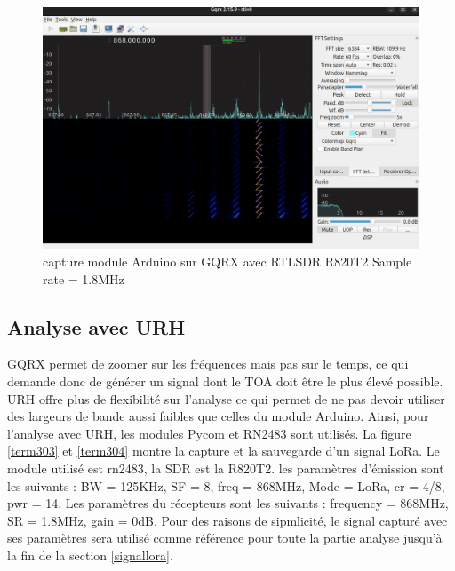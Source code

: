 \begin{figure}[h]
\centering

\includegraphics[scale=0.17]{images/gqrx5.png}
\caption{capture module Arduino sur GQRX avec RTLSDR R820T2 Sample rate = 1.8MHz}\label{term302}
\end{figure}


\subsection{Analyse avec URH}\label{urh}

GQRX permet de zoomer sur les fréquences mais pas sur le temps, ce qui demande donc de générer un signal dont le TOA doit être le plus élevé possible. URH offre plus de flexibilité sur l'analyse ce qui permet de ne pas devoir utiliser des largeurs de bande aussi faibles que celles du module Arduino. Ainsi, pour l'analyse avec URH, les modules Pycom et RN2483 sont utilisés. La figure \ref{term303} et \ref{term304} montre la capture et la sauvegarde d'un signal LoRa. Le module utilisé est rn2483, la SDR est la R820T2. les paramètres d'émission sont les suivants : BW = 125KHz, SF = 8, freq = 868MHz, Mode = LoRa, cr = 4/8, pwr = 14. Les paramètres du récepteurs sont les suivants : frequency = 868MHz, SR = 1.8MHz, gain = 0dB. Pour des raisons de sipmlicité, le signal capturé avec ses paramètres sera utilisé comme référence pour toute la partie analyse jusqu'à la fin de la section \ref{signallora}.

